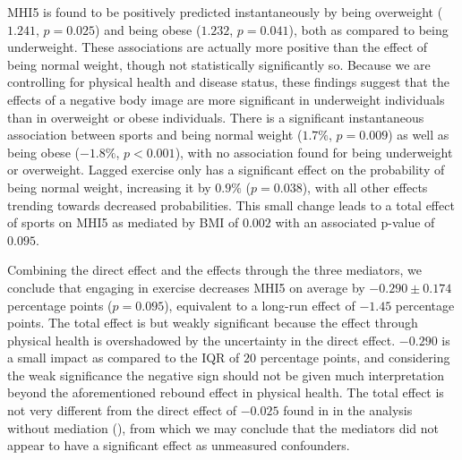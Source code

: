 MHI5 is found to be positively predicted instantaneously by being overweight ($1.241$, $p = 0.025$) and
being obese ($1.232$, $p = 0.041$), both as compared to being underweight. These associations are actually more positive
than the effect of being normal weight, though not statistically significantly so.
Because we are controlling for physical health and disease status, these findings suggest that the effects of a negative
body image are more significant in underweight individuals than in overweight or obese individuals.
There is a significant instantaneous association between sports and being normal weight ($1.7\%$, $p = 0.009$)
as well as being obese ($-1.8\%$, $p < 0.001$), with no association found for being underweight or overweight.
Lagged exercise only has a significant effect on the probability of being normal weight, increasing it by $0.9\%$ ($p = 0.038$),
with all other effects trending towards decreased probabilities.
This small change leads to a total effect of sports on MHI5 as mediated by BMI of $0.002$ with an associated p-value of $0.095$.

Combining the direct effect and the effects through the three mediators, we conclude that engaging in exercise decreases
MHI5 on average by $-0.290 \pm 0.174$ percentage points ($p = 0.095$), equivalent to a long-run effect of $-1.45$
percentage points.
The total effect is but weakly significant because the effect through physical health is overshadowed by the uncertainty
in the direct effect.
$-0.290$ is a small impact as compared to the IQR of $20$ percentage points, and considering the weak significance
the negative sign should not be given much interpretation beyond the aforementioned rebound effect in physical health.
The total effect is not very different from the direct effect of $-0.025$ found in in the analysis without mediation
(), from which we may conclude that the mediators did not appear to have a significant
effect as unmeasured confounders.

